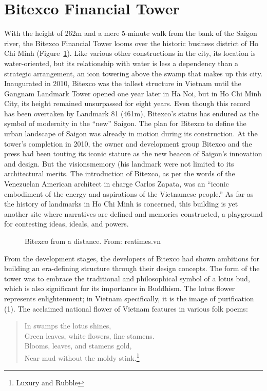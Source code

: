 \section{Bitexco Financial Tower}
With the height of 262m and a mere 5-minute walk from the bank of the Saigon river, the Bitexco Financial Tower looms over the historic business district of Ho Chi Minh (Figure~\ref{bitexco}). Like various other constructions in the city, its location is water-oriented, but its relationship with water is less a dependency than a strategic arrangement, an icon towering above the swamp that makes up this city. Inaugurated in 2010, Bitexco was the tallest structure in Vietnam until the Gangnam Landmark Tower opened one year later in Ha Noi, but in Ho Chi Minh City, its height remained unsurpassed for eight years.  Even though this record has been overtaken by Landmark 81 (461m), Bitexco’s status has endured as the symbol of modernity in the “new” Saigon.  The plan for Bitexco to define the urban landscape of Saigon was already in motion during its construction. At the tower’s completion in 2010, the owner and development group Bitexco and the press had been touting its iconic stature as the new beacon of Saigon’s innovation and design.  But the visionsmemory (his landmark were not limited to its architectural merits. The introduction of Bitexco, as per the words of the Venezuelan American architect in charge Carlos Zapata, was an “iconic embodiment of the energy and aspirations of the Vietnamese people.”  As far as the history of landmarks in Ho Chi Minh is concerned, this building is yet another site where narratives are defined and memories constructed, a playground for contesting ideas, ideals, and powers.
\en

\begin{figure}[!ht]
\begin{center}
\vspace{-.2 in}
\caption{\vi Bitexco from a distance. From: reatimes.vn}\label{bitexco}
\end{center}
\vspace{-.2 in}
\end{figure}

\vi From the development stages, the developers of Bitexco had shown ambitions for building an era-defining structure through their design concepts. The form of the tower was to embrace the traditional and philosophical symbol of a lotus bud, which is also significant for its importance in Buddhism. The lotus flower represents enlightenment; in Vietnam specifically, it is the image of purification (1). The acclaimed national flower of Vietnam features in various folk poems:
\begin{verse}
\begin{center}
\hspace{2em} In swamps the lotus shines, \\
Green leaves, white flowers, fine stamens.\\
\hspace{2em} Blooms, leaves, and stamens gold,\\
Near mud without the moldy stink.\footnote{Luxury and Rubble}
\end{center}
\end{verse}

